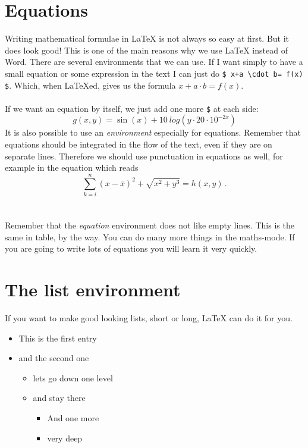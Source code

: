 \documentclass[12pt]{report}
\begin{document}
\section{Equations}

Writing mathematical formulae in LaTeX is not always so easy at first. But it
does look good! This is one of the main reasons why we use LaTeX instead of
Word. There are several environments that we can use. If I want simply to have
a small equation or some expression in the text I can just do {\tt \$ x+a
\textbackslash cdot b= f(x) \$}. Which, when LaTeXed, gives us the formula $x+a
\cdot b= f(x)$.
\\ \\
If we want an equation by itself, we just add one more {\tt \$} at each side:
$$ g(x,y)=\sin (x) + 10 \ log(y \cdot 20 \cdot 10^{-2x}) $$
It is also possible to use an {\sl environment} especially for equations.
Remember that equations should be integrated in the flow of the text, even if
they are on separate lines. Therefore we should use punctuation in equations as
well, for example in the equation which reads
\begin{equation}
  \sum_{k=i}^n (x- \overline{x})^2 +\sqrt{x^2 + y^3} = h(x,y) \label{eq:smart}
  \, .
\end{equation}
\\ \\
Remember that the {\sl equation} environment does not like empty lines.  This
is the same in table, by the way.  You can do many more things in the
maths-mode. If you are going to write lots of equations you will learn it very
quickly.

\section{The list environment}

If you want to make good looking lists, short or long, LaTeX can do it for you.

\begin{itemize}
\item This is the first entry
\item and the second one
  \begin{itemize}
    \item lets go down one level
    \item and stay there
      \begin{itemize}
          \item And one more
          \item very deep
      \end{itemize}
  \end{itemize}
\end{itemize}
\end{document}
